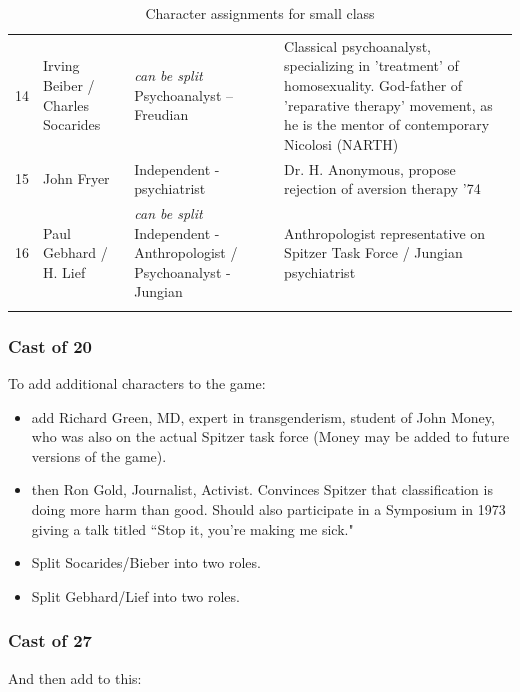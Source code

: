 \begin{refsection}
\begin{longtable}[!t]{ | p{0.6cm} | P{3.4cm} | P{5cm} | P{6.5cm} | }
14&
Irving Beiber / Charles Socarides&
\emph{can be split} \newline
Psychoanalyst – Freudian&
Classical psychoanalyst, specializing in 'treatment' of homosexuality. God-father of 'reparative therapy' movement, as he is the mentor of contemporary Nicolosi (NARTH) \\
15&
John Fryer&
Independent - psychiatrist&
Dr. H. Anonymous, propose rejection of aversion therapy '74\\
16&
Paul Gebhard / H. Lief&
\emph{can be split}\newline
Independent - Anthropologist / Psychoanalyst - Jungian&
Anthropologist representative on Spitzer Task Force / Jungian psychiatrist\\ \hline

\caption{Character assignments for small class}
\label{table: charactersmall}
\end{longtable}

\subsubsection{Cast of 20}
\label{castof20}

To add additional characters to the game:

\begin{itemize}
\item add Richard Green, MD, expert in transgenderism, student of John Money, who was also on the actual Spitzer task force (Money may be added to future versions of the game).

\item then Ron Gold, Journalist, Activist. Convinces Spitzer that classification is doing more harm than good. Should also participate in a Symposium in 1973 giving a talk titled “Stop it, you're making me sick."

\item Split Socarides\slash  Bieber into two roles.

\item Split Gebhard\slash  Lief into two roles.

\end{itemize}

\subsubsection{Cast of 27}
\label{castof27}

And then add to this:


\end{refsection}
